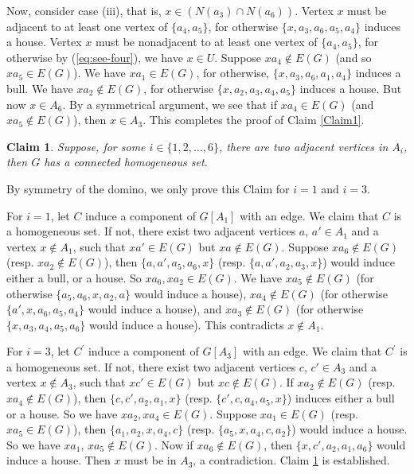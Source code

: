 \documentclass[a4paper,11pt]{article}
\newtheorem{claim}[theorem]{Claim}
\theoremstyle{case}
\newcommand{\thecolor}{black}
\begin{document}
    Now, consider case (iii), that is, $x\in (N(a_3)\cap N(a_6))$. Vertex $x$ must be adjacent to at least one vertex of $\{ a_4, a_5\}$, for otherwise $\{ x, a_3, a_6, a_5, a_4\}$ induces a house. 
    Vertex $x$ must be nonadjacent to at least one vertex of $\{ a_4, a_5\}$, for otherwise by (\ref{eq:see-four}), we have $x \in U$. Suppose $x a_4 \notin E(G)$ (and so $x a_5 \in E(G)$). We have $x a_1 \in E(G)$, for otherwise, $\{x, a_3, a_6,  a_1, a_4 \}$ induces a bull. We have $x a_2 \notin E(G)$, for otherwise $\{ x, a_2, a_3, a_4, a_5\}$ induces a house. But now $x \in A_6$. By a symmetrical argument, we see that if $x a_4 \in E(G)$ (and $ x a_5 \notin E(G)$), then $x \in A_3$.
    This completes the proof of Claim \ref{Claim1}.        

    
    \begin{claim}\label{Claim2}
        Suppose, for some $i\in \{1,2,\ldots,6\}$, there are two adjacent vertices in $A_i$, then $G$ has a \textcolor{\thecolor}{connected} homogeneous set.
    \end{claim} 

    By symmetry of the domino, we only prove this Claim for $i=1$ and $i=3$.
    
    \vspace{5pt}
    \noindent
    For $i=1$, let $C$ induce a component of $G[A_1]$ with an edge. We claim that $C$ is a homogeneous set. If not, there exist two adjacent vertices $a$, $a' \in A_1$ and a vertex $x \notin A_1$, such that $xa'\in E(G)$ but $xa\notin E(G)$. Suppose $xa_6\notin E(G)$ (resp. $xa_2\notin E(G)$), then $\{a,a',a_5,a_6,x\}$ (resp. $\{a, a', a_2,a_3, x\}$) would induce either a bull, or a house. So $xa_6, xa_2\in E(G)$. We have $xa_5\notin E(G)$ (for otherwise $\{ a_5, a_6, x, a_2, a\}$ would induce a house), $xa_4\notin E(G)$ (for otherwise $\{a', x, a_6, a_5, a_4\}$ would induce a house), and $xa_3\notin E(G)$ (for otherwise $\{x, a_3, a_4, a_5, a_6\}$ would induce a house). This contradicts $x\notin A_1$.

    \vspace{5pt}
    \noindent 
    For $i=3$, let $C^{'}$ induce a component of $G[A_3]$ with an edge. We claim that $C^{'}$ is a homogeneous set. If not, there exist two adjacent vertices $c$, $c' \in A_3$ and a vertex $x \notin A_3$, such that $xc'\in E(G)$ but $xc\notin E(G)$. If $xa_2\notin E(G)$ (resp. $xa_4\notin E(G)$), then $\{c, c', a_2, a_1, x\}$ (resp. $\{ c', c, a_4, a_5, x\}$) induces either a bull or a house. So we have $xa_2, xa_4 \in E(G)$. Suppose $xa_1 \in E(G)$ (resp. $xa_5\in E(G)$), then $\{a_1,a_2,x, a_4, c\}$ (resp. $\{a_5, x, a_4, c , a_2\}$) would induce a house. So we have $xa_1$, $xa_5 \not\in E(G)$. Now if $xa_6\notin E(G)$, then $\{ x, c', a_2, a_1, a_6\}$ would induce a house. Then $x$ must be in $A_3$, a contradiction. Claim \ref{Claim2} is established.
    
\end{document}
